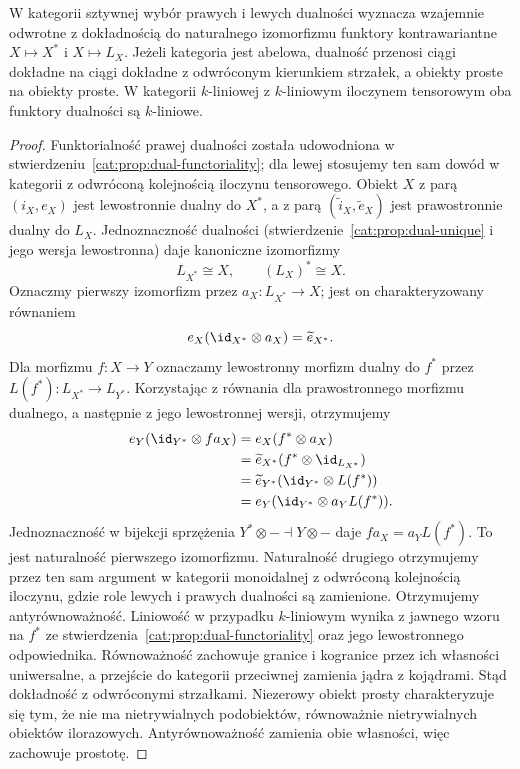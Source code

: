 \begin{stwierdzenie}\label{cat:prop:tf-duality-equivalence}
W kategorii sztywnej wybór prawych i lewych dualności wyznacza wzajemnie odwrotne z dokładnością do naturalnego izomorfizmu funktory kontrawariantne $X\mapsto X^*$ i $X\mapsto L_X$. Jeżeli kategoria jest abelowa, dualność przenosi ciągi dokładne na ciągi dokładne z odwróconym kierunkiem strzałek, a obiekty proste na obiekty proste. W kategorii $k$-liniowej z $k$-liniowym iloczynem tensorowym oba funktory dualności są $k$-liniowe.
\end{stwierdzenie}
\begin{proof}
Funktorialność prawej dualności została udowodniona w stwierdzeniu~\ref{cat:prop:dual-functoriality}; dla lewej stosujemy ten sam dowód w kategorii z odwróconą kolejnością iloczynu tensorowego. Obiekt $X$ z parą $(i_X,e_X)$ jest lewostronnie dualny do $X^*$, a z parą $(\widetilde i_X,\widetilde e_X)$ jest prawostronnie dualny do $L_X$. Jednoznaczność dualności (stwierdzenie~\ref{cat:prop:dual-unique} i jego wersja lewostronna) daje kanoniczne izomorfizmy
\[
 L_{X^*}\cong X,\qquad (L_X)^*\cong X.
\]
Oznaczmy pierwszy izomorfizm przez $a_X:L_{X^*}\to X$; jest on charakteryzowany równaniem
\[
 e_X(\id_{X^*}\otimes a_X)=\widetilde e_{X^*}.
\]
Dla morfizmu $f:X\to Y$ oznaczamy lewostronny morfizm dualny do $f^*$ przez $L(f^*):L_{X^*}\to L_{Y^*}$. Korzystając z równania dla prawostronnego morfizmu dualnego, a następnie z jego lewostronnej wersji, otrzymujemy
\[
\begin{aligned}
 e_Y(\id_{Y^*}\otimes f a_X)
 &= e_X(f^*\otimes a_X)\\
 &=\widetilde e_{X^*}(f^*\otimes\id_{L_{X^*}})\\
 &=\widetilde e_{Y^*}(\id_{Y^*}\otimes L(f^*))\\
 &=e_Y(\id_{Y^*}\otimes a_Y L(f^*)).
\end{aligned}
\]
Jednoznaczność w bijekcji sprzężenia $Y^*\otimes-\dashv Y\otimes-$ daje $fa_X=a_YL(f^*)$. To jest naturalność pierwszego izomorfizmu. Naturalność drugiego otrzymujemy przez ten sam argument w kategorii monoidalnej z odwróconą kolejnością iloczynu, gdzie role lewych i prawych dualności są zamienione. Otrzymujemy antyrównoważność. Liniowość w przypadku $k$-liniowym wynika z jawnego wzoru na $f^*$ ze stwierdzenia~\ref{cat:prop:dual-functoriality} oraz jego lewostronnego odpowiednika. Równoważność zachowuje granice i kogranice przez ich własności uniwersalne, a przejście do kategorii przeciwnej zamienia jądra z kojądrami. Stąd dokładność z odwróconymi strzałkami. Niezerowy obiekt prosty charakteryzuje się tym, że nie ma nietrywialnych podobiektów, równoważnie nietrywialnych obiektów ilorazowych. Antyrównoważność zamienia obie własności, więc zachowuje prostotę.
\end{proof}

